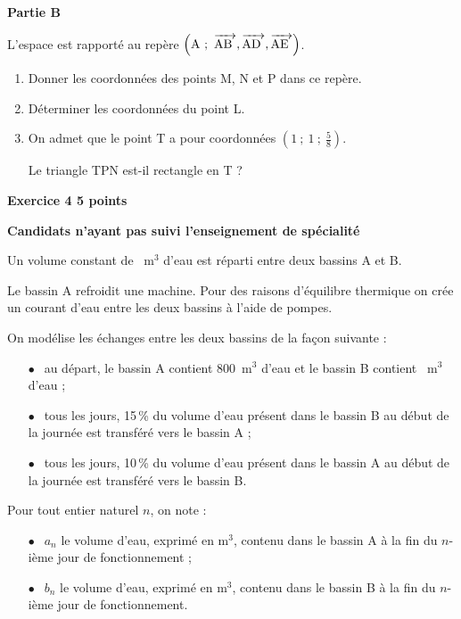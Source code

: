 \documentclass[10pt]{article}
\newcommand{\vect}[1]{\mathchoice%
{\overrightarrow{\displaystyle\mathstrut#1\,\,}}%
{\overrightarrow{\textstyle\mathstrut#1\,\,}}%
{\overrightarrow{\scriptstyle\mathstrut#1\,\,}}%
{\overrightarrow{\scriptscriptstyle\mathstrut#1\,\,}}}
\begin{document}
\bigskip
 
\textbf{Partie B}

\medskip
 
L'espace est rapporté au repère $\left(\text{A}~;~\vect{\text{AB}}, \vect{\text{AD}}, \vect{\text{AE}}\right)$.

\medskip
 
\begin{enumerate}
\item Donner les coordonnées des points M, N et P dans ce repère. 
\item Déterminer les coordonnées du point L. 
\item On admet que le point T a pour coordonnées $\left(1~;~1~;~\frac{5}{8}\right)$.
 
Le triangle TPN est-il rectangle en T ? 
\end{enumerate}

\vspace{0,5cm}

\textbf{Exercice 4 \hfill  5 points}

\textbf{Candidats n'ayant pas suivi l'enseignement de spécialité}

\medskip 
 
Un volume constant de ~m$^3$ d'eau est réparti entre deux bassins A et B.
 
Le bassin A refroidit une machine. Pour des raisons d'équilibre thermique on crée un courant d'eau entre les deux bassins à l'aide de pompes.
 
On modélise les échanges entre les deux bassins de la façon suivante :
 
\setlength\parindent{8mm}
\begin{itemize}
\item[$\bullet~~$] au départ, le bassin A contient 800~m$^3$ d'eau et le bassin B contient ~m$^3$ d'eau ; 
\item[$\bullet~~$] tous les jours, 15\,\% du volume d'eau présent dans le bassin B au début de la journée est transféré vers le bassin A ; 
\item[$\bullet~~$] tous les jours, 10\,\% du volume d'eau présent dans le bassin A au début de la journée est transféré vers le bassin B.
\end{itemize}
\setlength\parindent{0mm}
 
Pour tout entier naturel $n$, on note : 

\setlength\parindent{8mm}
\begin{itemize}
\item[$\bullet~~$] $a_{n}$ le volume d'eau, exprimé en m$^3$, contenu dans le bassin A à la fin du $n$-ième jour de fonctionnement ; 
\item[$\bullet~~$] $b_{n}$ le volume d'eau, exprimé en m$^3$, contenu dans le bassin B à la fin du $n$-ième jour de fonctionnement.
\end{itemize}
\setlength\parindent{0mm}
\end{document}
